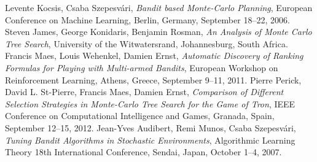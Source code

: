 \documentclass[a4paper,12pt]{article}
\begin{document}
\begin{thebibliography}{20}
	 Levente Kocsis, Csaba Szepesvári, \emph{Bandit based Monte-Carlo Planning}, European Conference on Machine Learning, Berlin, Germany, September 18--22, 2006.
	 Steven James, George Konidaris, Benjamin Rosman, \emph{An Analysis of Monte Carlo Tree Search}, University of the Witwatersrand, Johannesburg, South Africa.
	 Francis Maes, Louis Wehenkel, Damien Ernst, \emph{Automatic Discovery of Ranking Formulas for Playing with Multi-armed Bandits}, European Workshop on Reinforcement Learning, Athens, Greece, September 9--11, 2011.
	 Pierre Perick, David L. St-Pierre, Francis Maes, Damien Ernst, \emph{Comparison of Different Selection Strategies in Monte-Carlo Tree Search for the Game of Tron},  IEEE Conference on Computational Intelligence and Games, Granada, Spain, September 12--15, 2012. %
	  Jean-Yves Audibert, Remi Munos, Csaba Szepesvári, \emph{Tuning Bandit Algorithms in Stochastic Environments}, Algorithmic Learning Theory 18th International Conference, Sendai, Japan, October 1--4, 2007. %
\end{thebibliography}
\end{document}
